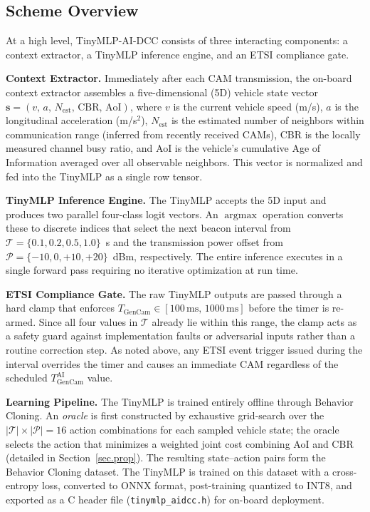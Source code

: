 \documentclass[journal]{IEEEtran}
\begin{document}
\subsection{Scheme Overview}
\label{subsec:overview}

At a high level, TinyMLP-AI-DCC consists of three interacting
components: a context extractor, a TinyMLP inference engine, and an
ETSI compliance gate.

\textbf{Context Extractor.}  Immediately after each CAM transmission,
the on-board context extractor assembles a five-dimensional
(5D) vehicle state vector
$\mathbf{s} = (v,\, a,\, N_{\text{est}},\, \text{CBR},\, \text{AoI})$,
where $v$ is the current vehicle speed (m/s), $a$ is the longitudinal
acceleration (m/s$^2$), $N_{\text{est}}$ is the estimated number of
neighbors within communication range (inferred from recently
received CAMs), CBR is the locally measured channel busy ratio, and
AoI is the vehicle's cumulative Age of Information averaged over all
observable neighbors.  This vector is normalized and fed into the
TinyMLP as a single row tensor.

\textbf{TinyMLP Inference Engine.}  The TinyMLP accepts the 5D
input and produces two parallel four-class logit vectors.
An $\operatorname{argmax}$ operation converts these to discrete
indices that select the next beacon interval from
$\mathcal{T} = \{0.1, 0.2, 0.5, 1.0\}$~s and the transmission
power offset from
$\mathcal{P} = \{-10, 0, +10, +20\}$~dBm, respectively.  The
entire inference executes in a single forward pass requiring no
iterative optimization at run time.

\textbf{ETSI Compliance Gate.}  The raw TinyMLP outputs are passed
through a hard clamp that enforces
$T_{\text{GenCam}} \in [100\,\text{ms},\, 1000\,\text{ms}]$ before
the timer is re-armed.  Since all four values in $\mathcal{T}$ already
lie within this range, the clamp acts as a safety guard against
implementation faults or adversarial inputs rather than a routine
correction step.  As noted above, any ETSI event trigger issued during
the interval overrides the timer and causes an immediate CAM
regardless of the scheduled $T_{\text{GenCam}}^{\mathrm{AI}}$ value.

\textbf{Learning Pipeline.}  The TinyMLP is trained entirely offline
through Behavior Cloning.  An \emph{oracle} is first constructed by
exhaustive grid-search over the $|\mathcal{T}| \times |\mathcal{P}| = 16$
action combinations for each sampled vehicle state; the oracle
selects the action that minimizes a weighted joint cost combining
AoI and CBR (detailed in Section~\ref{sec.prop}).  The resulting
state--action pairs form the Behavior Cloning dataset.  The TinyMLP
is trained on this dataset with a cross-entropy loss, converted to
ONNX format, post-training quantized to INT8, and exported as a
C header file (\texttt{tinymlp\_aidcc.h}) for on-board deployment.
\end{document}
